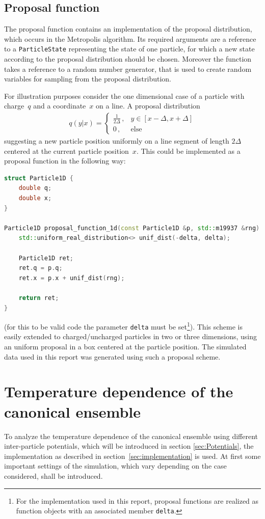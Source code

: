 \documentclass[11pt, a4paper]{article}
\numberwithin{equation}{section}
\begin{document}
\subsection{Proposal function} \label{sec:proposal_function}
The proposal function contains an implementation of the proposal distribution, which occurs in the Metropolis algorithm.
Its required arguments are a reference to a \texttt{ParticleState} representing the state of one particle, for which a new state according to the proposal distribution should be chosen.
Moreover the function takes a reference to a random number generator, that is used to create random variables for sampling from the proposal distribution.

For illustration purposes consider the one dimensional case of a particle with charge~$q$ and a coordinate~$x$ on a line.
A proposal distribution
\begin{align*}
	q(y|x) = \begin{cases}
		\frac{1}{2\Delta} \,, & y \in \left[x - \Delta, x + \Delta \right]\\
		0 \,, & \text{else}
	\end{cases}
\end{align*}
suggesting a new particle position uniformly on a line segment of length $2\Delta$ centered at the current particle position~$x$.
This could be implemented as a proposal function in the following way:
\begin{lstlisting}[language=C++]
struct Particle1D {
	double q;
	double x;
}

Particle1D proposal_function_1d(const Particle1D &p, std::m19937 &rng) {
	std::uniform_real_distribution<> unif_dist(-delta, delta);
	
	Particle1D ret;
	ret.q = p.q;
	ret.x = p.x + unif_dist(rng);
	
	return ret;
}
\end{lstlisting}
(for this to be valid code the parameter \texttt{delta} must be set\footnote{For the implementation used in this report, proposal functions are realized as function objects with an associated member \texttt{delta}.}).
This scheme is easily extended to charged/uncharged particles in two or three dimensions, using an uniform proposal in a box centered at the particle position.
The simulated data used in this report was generated using such a proposal scheme.


\section{Temperature dependence of the canonical ensemble} \label{sec:Temperature}
To analyze the temperature dependence of the canonical ensemble using different inter-particle potentials, which will be introduced in section \ref{sec:Potentials}, the implementation as described in section~\ref{sec:implementation} is used.
At first some important settings of the simulation, which vary depending on the case considered, shall be introduced.
\end{document}
